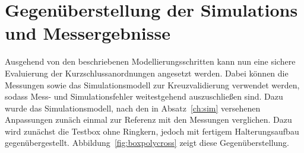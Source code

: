 \section{Gegen\"uberstellung der Simulations und Messergebnisse}
Ausgehend von den beschriebenen Modellierungsschritten kann nun eine sichere Evaluierung der Kurzschlussanordnungen angesetzt werden. Dabei k\"onnen die Messungen sowie das Simulationsmodell zur Kreuzvalidierung verwendet werden, sodass Mess- und Simulationsfehler weitestgehend auszuschlie\ss{}en sind. Dazu wurde das Simulationsmodell, nach den in Absatz~\ref{ch:sim} versehenen Anpassungen zun\"ach einmal zur Referenz mit den Messungen verglichen. Dazu wird zun\"achst die Testbox ohne Ringkern, jedoch mit fertigem Halterungsaufbau gegen\"ubergestellt. Abbildung~\ref{fig:boxpolycross} zeigt diese Gegen\"uberstellung.
\par
